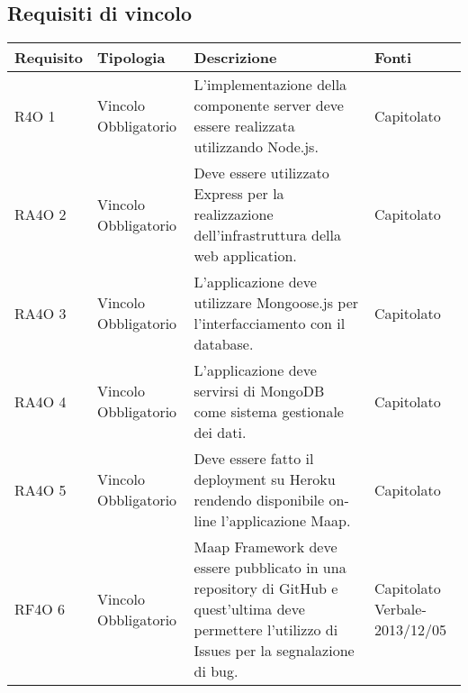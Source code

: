\subsection{Requisiti di vincolo }

      \begin{center}
      \bgroup
      \def\arraystretch{1.8}
      \begin{longtable}{ | l | p{2cm} | p{5cm} | p{1.7cm} |}
    
      \cellcolor[gray]{0.9} \textbf{Requisito} & \cellcolor[gray]{0.9} \textbf{Tipologia} 
      & \cellcolor[gray]{0.9} \textbf{Descrizione} & \cellcolor[gray]{0.9} \textbf{Fonti} \\ \hline
      
        R4O 1 & Vincolo \newline  Obbligatorio  & L’implementazione della componente server deve essere realizzata utilizzando Node.js. &  Capitolato \newline  \\ \hline      
        RA4O 2 & Vincolo \newline  Obbligatorio  & Deve essere utilizzato Express per la realizzazione dell’infrastruttura della web application. &  Capitolato \newline  \\ \hline      
        RA4O 3 & Vincolo \newline  Obbligatorio  & L’applicazione deve utilizzare Mongoose.js per l’interfacciamento con il database. &  Capitolato \newline  \\ \hline      
        RA4O 4 & Vincolo \newline  Obbligatorio  & L’applicazione deve servirsi di  MongoDB come sistema gestionale dei dati. &  Capitolato \newline  \\ \hline      
        RA4O 5 & Vincolo \newline  Obbligatorio  & Deve essere fatto il deployment su Heroku rendendo disponibile on-line l’applicazione Maap. &  Capitolato \newline  \\ \hline      
        RF4O 6 & Vincolo \newline  Obbligatorio  & Maap Framework deve essere pubblicato in una repository di GitHub e quest'ultima deve permettere l'utilizzo di Issues per la segnalazione di bug. &  Capitolato \newline  Verbale-2013/12/05 \newline  \\ \hline      

\end{longtable}
\end{center}
